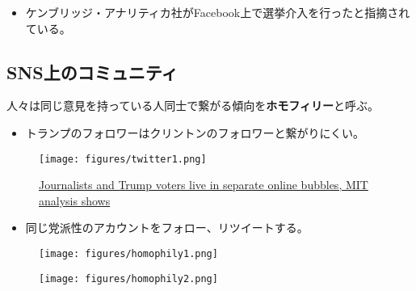\documentclass[
  xelatex,
  ja=standard]{bxjsarticle}
\providecommand{\tightlist}{%
  \setlength{\itemsep}{0pt}\setlength{\parskip}{0pt}}\usepackage{longtable,booktabs,array}
\begin{document}
\begin{itemize}
\tightlist
\item
  ケンブリッジ・アナリティカ社がFacebook上で選挙介入を行ったと指摘されている。
\end{itemize}

\hypertarget{snsux4e0aux306eux30b3ux30dfux30e5ux30cbux30c6ux30a3}{%
\subsection{SNS上のコミュニティ}\label{snsux4e0aux306eux30b3ux30dfux30e5ux30cbux30c6ux30a3}}

人々は同じ意見を持っている人同士で繋がる傾向を\textbf{ホモフィリー}と呼ぶ。

\begin{itemize}
\tightlist
\item
  トランプのフォロワーはクリントンのフォロワーと繋がりにくい。
\end{itemize}

\begin{figure}[htpb]

{\centering \texttt{[image: figures/twitter1.png]}

}

\caption{\href{https://www.vice.com/en/article/d3xamx/journalists-and-trump-voters-live-in-separate-online-bubbles-mit-analysis-shows}{Journalists
and Trump voters live in separate online bubbles, MIT analysis shows}}

\end{figure}

\begin{itemize}
\tightlist
\item
  同じ党派性のアカウントをフォロー、リツイートする。
\end{itemize}

\begin{figure}[htpb]

{\centering \texttt{[image: figures/homophily1.png]}

}

\caption{\citet{halberstam2016}}

\end{figure}

\begin{figure}[htpb]

{\centering \texttt{[image: figures/homophily2.png]}

}

\caption{\citet{halberstam2016}}

\end{figure}
\end{document}
